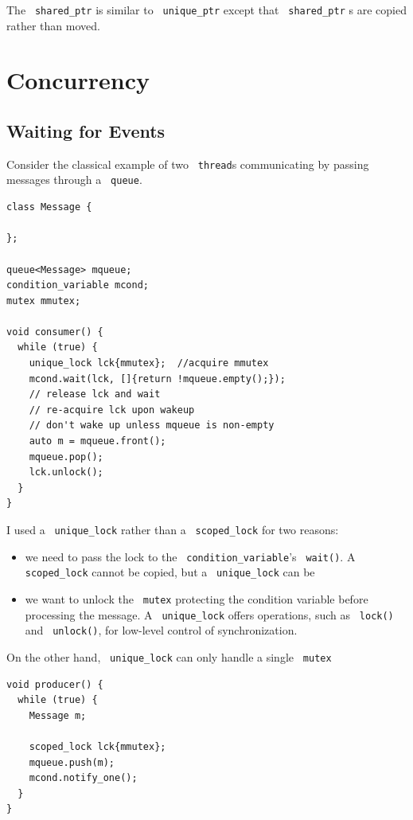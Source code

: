 \documentclass[11pt]{article}
\let\OldTexttt\texttt
\renewcommand{\texttt}[1]{\OldTexttt{\color{MidnightBlue} #1}}
\begin{document}
The \texttt{shared\_ptr} is similar to \texttt{unique\_ptr} except that \texttt{shared\_ptr} s are copied rather than moved.
\section{Concurrency}
\label{sec:org4348b17}
\subsection{Waiting for Events}
\label{sec:org78e7a87}
Consider the classical example of two \texttt{thread}​s communicating by passing messages through a \texttt{queue}.
\begin{verbatim}
class Message {

};

queue<Message> mqueue;
condition_variable mcond;
mutex mmutex;

void consumer() {
  while (true) {
    unique_lock lck{mmutex};  //acquire mmutex
    mcond.wait(lck, []{return !mqueue.empty();});
    // release lck and wait
    // re-acquire lck upon wakeup
    // don't wake up unless mqueue is non-empty
    auto m = mqueue.front();
    mqueue.pop();
    lck.unlock();
  }
}
\end{verbatim}

I used a \texttt{unique\_lock} rather than a \texttt{scoped\_lock} for two reasons:
\begin{itemize}
\item we need to pass the lock to the \texttt{condition\_variable}'s \texttt{wait()}. A \texttt{scoped\_lock} cannot be copied,
but a \texttt{unique\_lock} can be
\item we want to unlock the \texttt{mutex} protecting the condition variable before processing the message. A
\texttt{unique\_lock} offers operations, such as \texttt{lock()} and \texttt{unlock()}, for low-level control of
synchronization.
\end{itemize}

On the other hand, \texttt{unique\_lock} can only handle a single \texttt{mutex}

\begin{verbatim}
void producer() {
  while (true) {
    Message m;

    scoped_lock lck{mmutex};
    mqueue.push(m);
    mcond.notify_one();
  }
}
\end{verbatim}
\end{document}
